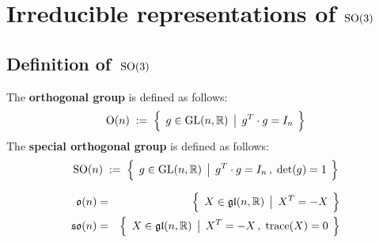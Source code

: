 

\chapter{Irreducible representations of $\textnormal{SO}(3)$}
\setcounter{theorem}{0}
\setcounter{equation}{0}


\renewcommand{\theenumi}{\roman{enumi}}
\renewcommand{\labelenumi}{\textnormal{(\theenumi)}$\;\;$}


\section{Definition of \,$\textnormal{SO}(3)$}


\vskip 0.1cm
\begin{definition}
\mbox{}
\vskip 0.1cm
\noindent
The \textbf{orthogonal group} is defined as follows:
\begin{equation*}
\textnormal{O}(n)
\; := \;
	\left\{\;\,
		g \overset{{\color{white}.}}{\in} \textnormal{GL}(n,\Re)
		\;\left\vert\;\,
			g^{T} \cdot g = I_{n}
			\right.
		\;\right\}
\end{equation*}
The \textbf{special orthogonal group} is defined as follows:
\begin{equation*}
\textnormal{SO}(n)
\; := \;
	\left\{\;\,
		g \overset{{\color{white}.}}{\in} \textnormal{GL}(n,\Re)
		\;\left\vert\;\,
			g^{T} \cdot g = I_{n}\,,
			\;
			\textnormal{det}(g) = 1
			\right.
		\;\right\}
\end{equation*}
\end{definition}

\begin{proposition}
\begin{eqnarray*}
\mathfrak{o}(n)
& = &
	\left\{\;\,
		X \overset{{\color{white}.}}{\in} \mathfrak{gl}(n,\Re)
		\;\left\vert\;\,
			X^{T} = -X
			\right.
		\;\right\}
\\
\mathfrak{so}(n)
& = &
	\left\{\;\,
		X \overset{{\color{white}.}}{\in} \mathfrak{gl}(n,\Re)
		\;\left\vert\;\,
			X^{T} = -X\,,
			\;
			\textnormal{trace}(X) = 0
			\right.
		\;\right\}
\end{eqnarray*}
\end{proposition}

